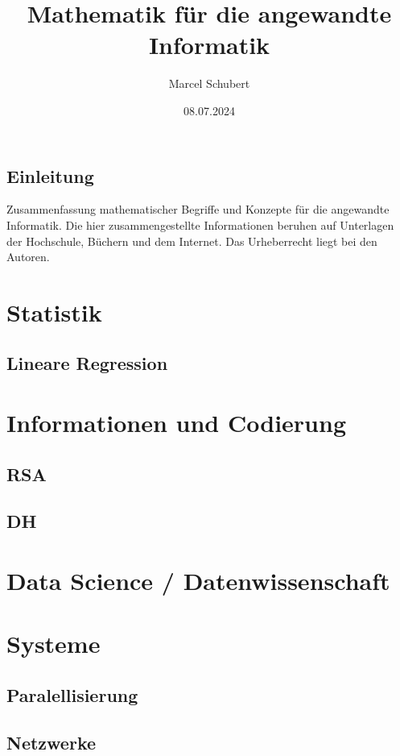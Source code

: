 \documentclass{report}
\author{Marcel Schubert}
\title{Mathematik für die angewandte Informatik}
\date{08.07.2024}
\begin{document}
\maketitle

\tableofcontents

\section*{Einleitung}
Zusammenfassung mathematischer Begriffe und Konzepte für die angewandte Informatik.
Die hier zusammengestellte Informationen beruhen auf Unterlagen der Hochschule, Büchern und dem Internet.
Das Urheberrecht liegt bei den Autoren.







\chapter{Statistik}
\section{Lineare Regression}

\chapter{Informationen und Codierung}
\section{RSA}
\section{DH}

\chapter{Data Science / Datenwissenschaft}

\chapter{Systeme}
\section{Paralellisierung}
\section{Netzwerke}
\end{document}
